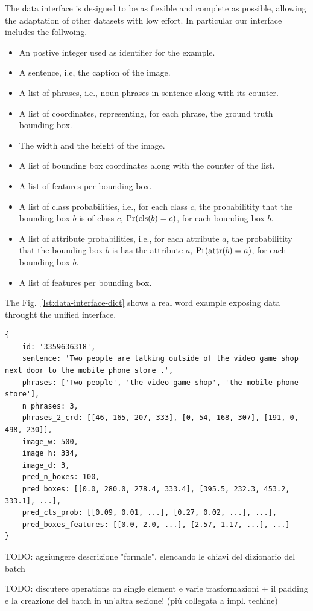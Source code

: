 The data interface is designed to be as flexible and complete as
possible, allowing the adaptation of other datasets with low effort.
In particular our interface includes the follwoing.

\begin{itemize}
  \item An postive integer used as identifier for the example.
  \item A sentence, i.e, the caption of the image.
  \item A list of phrases, i.e., noun phrases in sentence along with
  its counter.
  \item A list of coordinates, representing, for each phrase, the
  ground truth bounding box.
  \item The width and the height of the image.
  \item A list of bounding box coordinates along with the counter of
  the list.
  \item A list of features per bounding box.
  \item A list of class probabilities, i.e., for each class $c$, the
  probabilitity that the bounding box $b$ is of class $c$, $\Pr(\text{cls}(b)
  = c)$, for each bounding box $b$.
  \item A list of attribute probabilities, i.e., for each attribute
  $a$, the probabilitity that the bounding box $b$ is has the
  attribute $a$, $\Pr(\text{attr}(b) = a)$, for each bounding box $b$.
  \item A list of features per bounding box.
\end{itemize}

The Fig.~\ref{lst:data-interface-dict} shows a real word example
exposing data throught the unified interface.

\begin{lstlisting}[style=simplepython,caption=TODO,label={lst:data-interface-dict}]
{
    id: '3359636318', 
    sentence: 'Two people are talking outside of the video game shop next door to the mobile phone store .', 
    phrases: ['Two people', 'the video game shop', 'the mobile phone store'], 
    n_phrases: 3, 
    phrases_2_crd: [[46, 165, 207, 333], [0, 54, 168, 307], [191, 0, 498, 230]], 
    image_w: 500, 
    image_h: 334, 
    image_d: 3, 
    pred_n_boxes: 100, 
    pred_boxes: [[0.0, 280.0, 278.4, 333.4], [395.5, 232.3, 453.2, 333.1], ...], 
    pred_cls_prob: [[0.09, 0.01, ...], [0.27, 0.02, ...], ...],
    pred_boxes_features: [[0.0, 2.0, ...], [2.57, 1.17, ...], ...]
}
\end{lstlisting}


TODO: aggiungere descrizione "formale", elencando le chiavi del dizionario del batch




TODO: discutere operations on single element e varie trasformazioni + il padding e la creazione del batch in un'altra sezione! (più collegata a impl. techine)